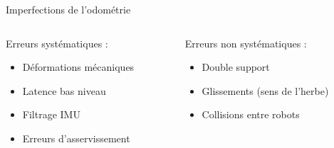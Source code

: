 \begin{frame}{Imperfections de l'odométrie}
    \begin{columns}
        \begin{column}[T]{0.45\linewidth}
            Erreurs systématiques :
            \begin{itemize}
                \setlength\itemsep{0.5em}
                \item Déformations mécaniques
                \item Latence bas niveau
                \item Filtrage IMU
                \item Erreurs d'asservissement
            \end{itemize}
        \end{column}
        \begin{column}[T]{0.45\linewidth}
            Erreurs non systématiques :
            \begin{itemize}
                \setlength\itemsep{0.5em}
                \item Double support
                \item Glissements (sens de l'herbe)
                \item Collisions entre robots
            \end{itemize}
        \end{column}
    \end{columns}
\end{frame}
